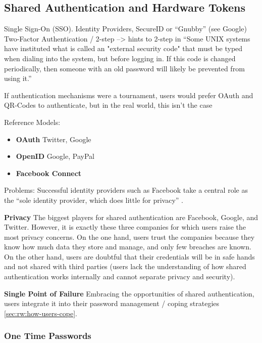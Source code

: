 	\subsection{Shared Authentication and Hardware Tokens}\label{sec:rw:shared_auth_tokens}
Single Sign-On (SSO). 
Identity Providers, 
SecureID or ``Gnubby'' (see Google)
Two-Factor Authentication / 2-step --> hints to 2-step in ``Some UNIX systems have instituted what is called an "external security code" that must be typed when dialing into the system, but before logging in. If this code is changed periodically, then someone with an old password will likely be prevented from using it.'' \cite{Morris1979PasswordSecurity}


If authentication mechanisms were a tournament, users would prefer OAuth and QR-Codes to authenticate, but in the real world, this isn't the case \cite{Ruoti2015AuthenticationMelee}

Reference Models:
\cite{Egelman2013ProfilePassword,Sun2010BillionKeys}

\begin{itemize}
\item \textbf{OAuth} Twitter, Google
\item \textbf{OpenID} Google, PayPal
\item \textbf{Facebook Connect} 
\end{itemize}
Problems: 
Successful identity providers such as Facebook take a central role as the ``sole identity provider, which does little for privacy'' \cite{Bonneau2015ImperfectAuthentication}.


\textbf{Privacy} The biggest players for shared authentication are Facebook, Google, and Twitter. However, it is exactly these three companies for which users raise the most privacy concerns. On the one hand, users trust the companies because they know how much data they store and manage, and only few breaches are known. On the other hand, users are doubtful that their credentials will be in safe hands and not shared with third parties (users lack the understanding of how shared authentication works internally and cannot separate privacy and security). 

\textbf{Single Point of Failure} Embracing the opportunities of shared authentication, users integrate it into their password management / coping strategies \ref{sec:rw:how-users-cope}. 

	
\subsubsection{One Time Passwords}

